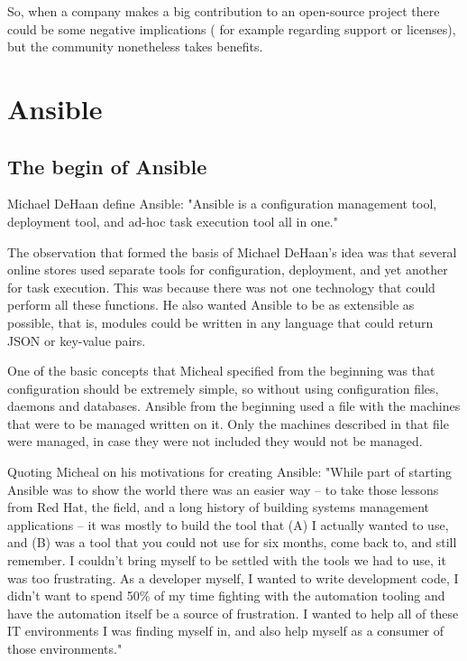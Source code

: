 \documentclass[12pt,a4paper,openright,twoside]{book}
\begin{document}
So, when a company makes a big contribution to an open-source project there could be some negative implications ( for example regarding support or licenses), but the community nonetheless takes benefits.

\chapter{Ansible}

\section{The begin of Ansible}

Michael DeHaan define Ansible:
"Ansible is a configuration management tool, deployment tool, and ad-hoc task execution tool all in one."

The observation that formed the basis of Michael DeHaan's idea was that several online stores used separate tools for configuration, deployment, and yet another for task execution. This was because there was not one technology that could perform all these functions.
He also wanted Ansible to be as extensible as possible, that is, modules could be written in any language that could return JSON or key-value pairs.

One of the basic concepts that Micheal specified from the beginning was that configuration should be extremely simple, so without using configuration files, daemons and databases. Ansible from the beginning used a file with the machines that were to be managed written on it. Only the machines described in that file were managed, in case they were not included they would not be managed.

Quoting Micheal on his motivations for creating Ansible:
"While part of starting Ansible was to show the world there was an easier way -- to take those lessons from Red Hat, the field, and a long history of building systems management applications -- it was mostly to build the tool that (A) I actually wanted to use, and (B) was a tool that you could not use for six months, come back to, and still remember. I couldn't bring myself to be settled with the tools we had to use, it was too frustrating. As a developer myself, I wanted to write development code, I didn't want to spend 50\% of my time fighting with the automation tooling and have the automation itself be a source of frustration. I wanted to help all of these IT environments I was finding myself in, and also help myself as a consumer of those environments."
\end{document}

